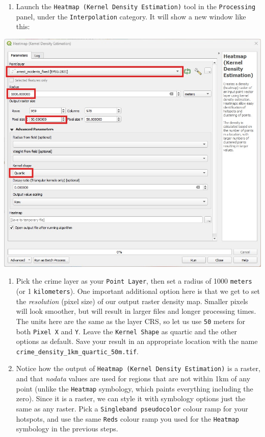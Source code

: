 \documentclass[
  letterpaper,
  DIV=11,
  numbers=noendperiod]{scrreprt}
\providecommand{\tightlist}{%
  \setlength{\itemsep}{0pt}\setlength{\parskip}{0pt}}\usepackage{longtable,booktabs,array}
\begin{document}
\begin{enumerate}
\def\labelenumi{(\arabic{enumi})}
\setcounter{enumi}{332}
\tightlist
\item
  Launch the \texttt{Heatmap\ (Kernel\ Density\ Estimation)} tool in the
  \texttt{Processing} panel, under the \texttt{Interpolation} category.
  It will show a new window like this:
\end{enumerate}

\includegraphics{images/lab_13/lab13_fig_kernel_window.jpg}

\begin{enumerate}
\def\labelenumi{(\arabic{enumi})}
\setcounter{enumi}{333}
\item
  Pick the crime layer as your \texttt{Point\ Layer}, then set a radius
  of 1000 \texttt{meters} (or 1 \texttt{kilometers}). One important
  additional option here is that we get to set the \emph{resolution}
  (pixel size) of our output raster density map. Smaller pixels will
  look smoother, but will result in larger files and longer processing
  times. The units here are the same as the layer CRS, so let us use
  \texttt{50} meters for both \texttt{Pixel\ X} and \texttt{Y}. Leave
  the \texttt{Kernel\ Shape} as quartic and the other options as
  default. Save your result in an appropriate location with the name
  \texttt{crime\_density\_1km\_quartic\_50m.tif}.
\item
  Notice how the output of
  \texttt{Heatmap\ (Kernel\ Density\ Estimation)} is a raster, and that
  \emph{nodata} values are used for regions that are not within 1km of
  any point (unlike the \texttt{Heatmap} symbology, which paints
  everything including the zero). Since it is a raster, we can style it
  with symbology options just the same as any raster. Pick a
  \texttt{Singleband\ pseudocolor} colour ramp for your hotspots, and
  use the same \texttt{Reds} colour ramp you used for the
  \texttt{Heatmap} symbology in the previous steps.
\end{enumerate}
\end{document}
